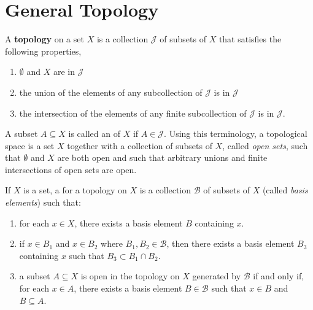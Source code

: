 \section{General Topology}

\begin{definition}
A \textbf{topology} on a set $X$ is a collection $\mathcal{J}$ of subsets of $X$ that satisfies the following properties,
\begin{enumerate}
\item $\emptyset$ and $X$ are in $\mathcal{J}$
\item the union of the elements of any subcollection of $\mathcal{J}$ is in $\mathcal{J}$
\item the intersection of the elements of any finite subcollection of $\mathcal{J}$ is in $\mathcal{J}$.
\end{enumerate}
\end{definition}

A subset $A \subseteq X$ is called an  of $X$ if $A \in \mathcal{J}$.
Using this terminology, a topological space is a set $X$ together with a collection of subsets of $X$, called \emph{open sets}, such that $\emptyset$ and $X$ are both open and such that arbitrary unions and finite intersections of open sets are open.

\begin{definition}
\label{definition:topology_basis}
If $X$ is a set, a  for a topology on $X$ is a collection $\mathcal{B}$ of subsets of $X$ (called \emph{basis elements}) such that:
\begin{enumerate}
\item for each $x \in X$, there exists a basis element $B$ containing $x$.
\item if $x \in B_1$ and $x \in B_2$ where $B_1, B_2 \in \mathcal{B}$, then there exists a basis element $B_3$ containing $x$ such that $B_3 \subset B_1 \cap B_2$.
\item a subset $A \subseteq X$ is open in the topology on $X$ generated by $\mathcal{B}$ if and only if, for each $x \in A$, there exists a basis element $B \in \mathcal{B}$ such that $x \in B$ and $B \subseteq A$.
\end{enumerate}
\end{definition}


